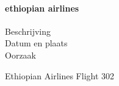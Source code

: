 
 


\paragraph{ethiopian airlines}

\begin{description}
\item[Beschrijving]
\item[Datum en plaats] 
\item[Oorzaak]
\end{description}
Ethiopian Airlines Flight 302



